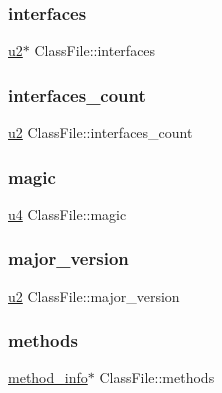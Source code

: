 \subsubsection{\texorpdfstring{interfaces}{interfaces}}
{\footnotesize\ttfamily \hyperlink{ClassLoader_8h_a5f223212eef04d10a4550ded680cb1cf}{u2}$\ast$ Class\+File\+::interfaces}

\mbox{\label{structClassFile_a337fcb7da33d1b64631441115c7de305}} 
\subsubsection{\texorpdfstring{interfaces\+\_\+count}{interfaces\_count}}
{\footnotesize\ttfamily \hyperlink{ClassLoader_8h_a5f223212eef04d10a4550ded680cb1cf}{u2} Class\+File\+::interfaces\+\_\+count}

\mbox{\label{structClassFile_a09085e9db513dae2f46da6e0a26c1b59}} 
\subsubsection{\texorpdfstring{magic}{magic}}
{\footnotesize\ttfamily \hyperlink{ClassLoader_8h_aedf6ddc03df8caaaccbb4c60b9a9b850}{u4} Class\+File\+::magic}

\mbox{\label{structClassFile_abede9cb937e65072517d0ee6e26e2757}} 
\subsubsection{\texorpdfstring{major\+\_\+version}{major\_version}}
{\footnotesize\ttfamily \hyperlink{ClassLoader_8h_a5f223212eef04d10a4550ded680cb1cf}{u2} Class\+File\+::major\+\_\+version}

\mbox{\label{structClassFile_ad061f06cd709d10dbfbf82f443e43632}} 
\subsubsection{\texorpdfstring{methods}{methods}}
{\footnotesize\ttfamily \hyperlink{structmethod__info}{method\+\_\+info}$\ast$ Class\+File\+::methods}

